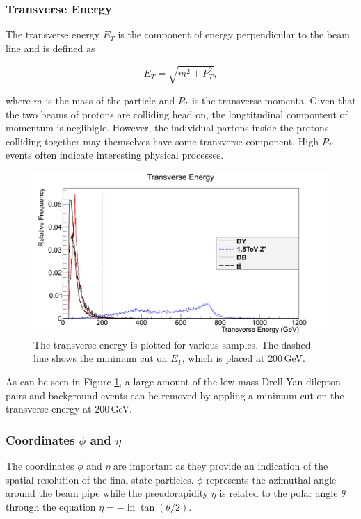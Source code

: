 \documentclass{article}
\begin{document}
\subsubsection{Transverse Energy}

The transverse energy $E_T$ is the component of energy perpendicular to the beam line and is defined as 

\begin{equation}
E_{T} = \sqrt{m^2 + P_{T}^2},
\end{equation}

where $m$ is the mass of the particle and $P_T$ is the transverse momenta. Given that the two beams of protons are colliding head on, the longtitudinal compontent of momentum is neglibigle. However, the individual partons inside the protons colliding together may themselves have some transverse component. High $P_T$ events often indicate interesting physical processes.

\begin{figure}[h]
    \centering
    \includegraphics[scale=0.25]{images/variables/Et.png}
    \caption{The transverse energy is plotted for various samples. The dashed line shows the minimum cut on $E_T$, which is placed at $200\,$GeV. \label{fig:Et} }
\end{figure}

As can be seen in Figure \ref{fig:Et}, a large amount of the low mass Drell-Yan dilepton pairs and background events can be removed by appling a minimum cut on the transverse energy at $200\,$GeV. 

\subsubsection{Coordinates $\phi$ and $\eta$}

The coordinates $\phi$ and $\eta$ are important as they provide an indication of the spatial resolution of the final state particles. $\phi$ represents the azimuthal angle around the beam pipe while the pseudorapidity $\eta$ is related to the polar angle $\theta$ through the equation $\eta = -\ln \tan (\theta/2)$. 
\end{document}
